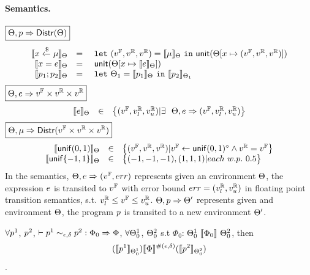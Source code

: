 \documentclass[a4paper,11pt]{article}
\begin{document}
\paragraph{Semantics.}
$\boxed{\Theta, p \Rightarrow \mathsf{Distr}(\Theta)}$
\[
	\begin{array}{rcl}
	\llbracket x \xleftarrow{\$} \mu \rrbracket_{\Theta}
	& = & 
	~\mathtt{let}~ (v^{\mathbb{F}}, v^{\mathbb{R}}, v^{\mathbb{R}}) = \llbracket \mu \rrbracket_{\Theta} 
	~\mathtt{in}~ 
	\mathsf{unit}(\Theta[x \mapsto (v^{\mathbb{F}}, v^{\mathbb{R}}, v^{\mathbb{R}})])
	\\
	\llbracket x = e \rrbracket_{\Theta}
	& = &  
	~\mathsf{unit}(\Theta[x \mapsto \llbracket e \rrbracket_{\Theta}])
	\\
	\llbracket p_1; p_2 \rrbracket_{\Theta}
	& = &  ~\mathtt{let}~  \Theta_1 = 
	\llbracket p_1 \rrbracket_{\Theta} ~\mathtt{in}~
	\llbracket p_2 \rrbracket_{\Theta_1} 
	\end{array}
\]
$\boxed{\Theta, e \Rightarrow v^{\mathbb{F}} \times v^{\mathbb{R}} \times v^{\mathbb{R}}}$
\[
	\begin{array}{rcl}
	\llbracket e \rrbracket_{\Theta}
	& \in &  
	\big\{(v^{\mathbb{F}}, v^{\mathbb{R}}_{l}, v^{\mathbb{R}}_{u}) |
	\exists ~~  
	\Theta,  
	e \Rightarrow (v^{\mathbb{F}}, v^{\mathbb{R}}_{l}, v^{\mathbb{R}}_{u})\big\}
	\end{array}
\]
$
\boxed{\Theta, \mu \Rightarrow \mathsf{Distr}(v^{\mathbb{F}} \times v^{\mathbb{R}} \times v^{\mathbb{R}})}
$
\[
	\begin{array}{rcl}
	\llbracket \mathsf{unif}(0, 1) \rrbracket_{\Theta}
	& \in & 
	\big\{
	(v^{\mathbb{F}}, v^{\mathbb{R}}, v^{\mathbb{R}}) |
	v^{\mathbb{F}} \leftarrow \mathsf{unif}(0, 1)^{\diamond}
	\land v^{\mathbb{R}} = v^{\mathbb{F}}
	\big\}\\
	\llbracket \mathsf{unif}\{-1, 1\} \rrbracket_{\Theta}
	& \in & 
	\big\{
	(-1, -1, -1), (1, 1, 1) |
	each ~ w.p. ~ 0.5 
	\big\}\\	
	\end{array}
\]
In the semantics, 
$\Theta, e \Rightarrow (v^{\mathbb{F}}, err)$ represents given an environment $\Theta$, the expression $e$
is transited to $v^{\mathbb{F}}$ with error bound $err = (v^{\mathbb{R}}_{l}, v^{\mathbb{R}}_{u})$ in floating point transition semantics, s.t. $v^{\mathbb{R}}_{l} \leq v^{\mathbb{F}} \leq v^{\mathbb{R}}_{u}$. 
$\Theta, p \Rightarrow \Theta'$ represents given and environment $\Theta$, the program $p$ is transited to a new environment $\Theta'$.


\clearpage
\begin{thm}[Soundness]
 $\forall p^1$, $p^2$,  $ \vdash p^1	
\sim_{\epsilon, \delta} 
p^2 :
\Phi_0 \Rightarrow \Phi $,    $\forall \Theta^1_0$, $\Theta^2_0$ 
s.t $\Phi_0$: 
$\Theta^1_0 ~ \llbracket \Phi_0 \rrbracket ~ \Theta^2_0$,
then
$$ 
(\llbracket p^1 \rrbracket_{\Theta^1_0})  
\llbracket \Phi \rrbracket^{\#(\epsilon, \delta)} 
(\llbracket p^2 \rrbracket_{\Theta^2_0}) 
$$.
\end{thm}
\end{document}
